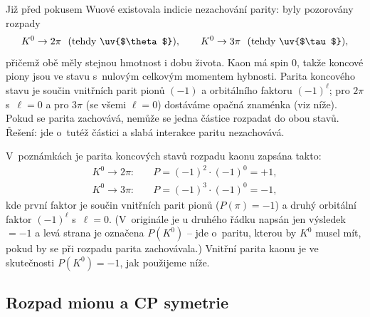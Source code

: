 \begin{vysvetleni}
  Již před pokusem Wuové existovala indicie nezachování parity: byly pozorovány rozpady
  \begin{equation*}
    K^0 \to 2\pi \ \ (\text{tehdy \uv{$\theta$}}), \qquad K^0 \to 3\pi \ \ (\text{tehdy \uv{$\tau$}}),
  \end{equation*}
  přičemž obě  měly stejnou hmotnost i dobu života. Kaon má spin 0, takže koncové piony jsou ve stavu s~nulovým celkovým momentem hybnosti. Parita koncového stavu je součin vnitřních parit pionů $(-1)$ a orbitálního faktoru $(-1)^\ell$; pro $2\pi$ s~$\ell=0$ a pro $3\pi$ (se všemi $\ell=0$) dostáváme opačná znaménka (viz níže). Pokud se parita zachovává, nemůže se jedna částice rozpadat do obou stavů. Řešení: jde o~tutéž částici a slabá interakce paritu nezachovává.
\end{vysvetleni}
V~poznámkách je parita koncových stavů rozpadu kaonu zapsána takto:
\begin{align}
  K^0 \to 2\pi: &\quad P = (-1)^2\cdot(-1)^0 = +1, \\
  K^0 \to 3\pi: &\quad P = (-1)^3\cdot(-1)^0 = -1,
\end{align}
kde první faktor je součin vnitřních parit pionů ($P(\pi)=-1$) a druhý orbitální faktor $(-1)^\ell$ s~$\ell=0$. (V~originále je u druhého řádku napsán jen výsledek $=-1$ a levá strana je označena $P(K^0)$ -- jde o~paritu, kterou by $K^0$ musel mít, pokud by se při rozpadu parita zachovávala.) Vnitřní parita kaonu je ve skutečnosti $P(K^0)=-1$, jak použijeme níže.

\subsection{Rozpad mionu a CP symetrie}

